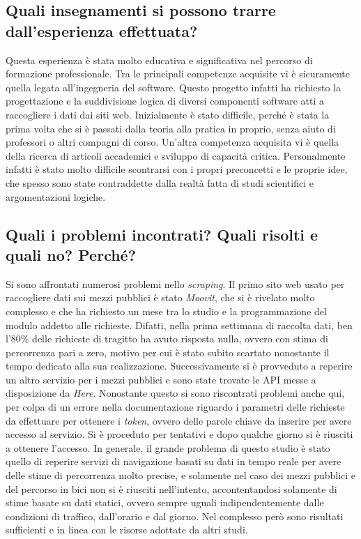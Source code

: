 \documentclass[a4paper,12pt]{article}
\begin{document}
\subsection{Quali insegnamenti si possono trarre dall'esperienza effettuata?}
Questa esperienza è stata molto educativa e significativa nel percorso di formazione professionale. Tra le principali competenze acquisite vi è sicuramente quella legata all'ingegneria del software. Questo progetto infatti ha richiesto la progettazione e la suddivisione logica di diversi componenti software atti a raccogliere i dati dai siti web. Inizialmente è stato difficile, perché è stata la prima volta che si è passati dalla teoria alla pratica in proprio, senza aiuto di professori o altri compagni di corso. Un'altra competenza acquisita vi è quella della ricerca di articoli accademici e sviluppo di capacità critica. Personalmente infatti è stato molto difficile scontrarsi con i propri preconcetti e le proprie idee, che spesso sono state contraddette dalla realtà fatta di studi scientifici e argomentazioni logiche.

\subsection{Quali i problemi incontrati? Quali risolti e quali no? Perché?}
Si sono affrontati numerosi problemi nello \textit{scraping}. Il primo sito web usato per raccogliere dati sui mezzi pubblici è stato \textit{Moovit}, che si è rivelato molto complesso e che ha richiesto un mese tra lo studio e la programmazione del modulo addetto alle richieste. Difatti, nella prima settimana di raccolta dati, ben l'80\% delle richieste di tragitto ha avuto risposta nulla, ovvero con stima di percorrenza pari a zero, motivo per cui è stato subito scartato nonostante il tempo dedicato alla sua realizzazione. Successivamente si è provveduto a reperire un altro servizio per i mezzi pubblici e sono state trovate le API messe a disposizione da \textit{Here}. Nonostante questo si sono riscontrati problemi anche qui, per colpa di un errore nella documentazione riguardo i parametri delle richieste da effettuare per ottenere i \textit{token}, ovvero delle parole chiave da inserire per avere accesso al servizio. Si è proceduto per tentativi e dopo qualche giorno si è riusciti a ottenere l'accesso. In generale, il grande problema di questo studio è stato quello di reperire servizi di navigazione basati su dati in tempo reale per avere delle stime di percorrenza molto precise, e solamente nel caso dei mezzi pubblici e del percorso in bici non si è riusciti nell'intento, accontentandosi solamente di stime basate su dati statici, ovvero sempre uguali indipendentemente dalle condizioni di traffico, dall'orario e dal giorno. Nel complesso però sono risultati sufficienti e in linea con le risorse adottate da altri studi.

\nocite{isfortaudimob}
\nocite{ellison2011travel}
\nocite{faghih2017hail}
\nocite{pagani2017knowledge}
\nocite{chien2003dynamic}



\end{document}
